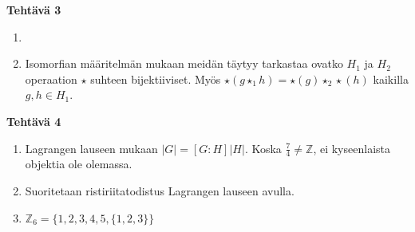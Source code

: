 \documentclass[11pt,a4paper]{amsart}
\newcommand{\1}{\mathbf{1}}
\begin{document}
\begin{Solution}
  \textbf{Tehtävä 3}
  \begin{enumerate}
    \item
    \item Isomorfian määritelmän mukaan meidän täytyy tarkastaa ovatko $H_1$ ja $H_2$ ope\-raation $\star$ suhteen bijektiiviset. Myös $\star(g\star_1 h)=\star(g)\star_2 \star(h)$ kaikilla $g,h\in H_1$.
  \end{enumerate}
\end{Solution}

\begin{Solution}
  \textbf{Tehtävä 4}
  \begin{enumerate}
    \item Lagrangen lauseen mukaan $|G|=[G:H]|H|$. Koska $\frac{7}{4} \not = \mathbb{Z}$, ei kyseenlaista objektia ole olemassa.
    \item Suoritetaan ristiriitatodistus Lagrangen lauseen avulla.
    \item $\mathbb{Z}_6=\{1,2,3,4,5,\{1,2,3\}\}$
  \end{enumerate}
\end{Solution}
\end{document}
